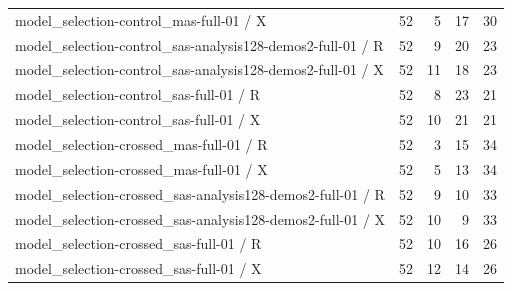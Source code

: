 \begin{longtable}{p{}rrrr}
model\_selection-control\_mas-full-01 / X & 52 & 5 & 17 & 30 \\
model\_selection-control\_sas-analysis128-demos2-full-01 / R & 52 & 9 & 20 & 23 \\
model\_selection-control\_sas-analysis128-demos2-full-01 / X & 52 & 11 & 18 & 23 \\
model\_selection-control\_sas-full-01 / R & 52 & 8 & 23 & 21 \\
model\_selection-control\_sas-full-01 / X & 52 & 10 & 21 & 21 \\
model\_selection-crossed\_mas-full-01 / R & 52 & 3 & 15 & 34 \\
model\_selection-crossed\_mas-full-01 / X & 52 & 5 & 13 & 34 \\
model\_selection-crossed\_sas-analysis128-demos2-full-01 / R & 52 & 9 & 10 & 33 \\
model\_selection-crossed\_sas-analysis128-demos2-full-01 / X & 52 & 10 & 9 & 33 \\
model\_selection-crossed\_sas-full-01 / R & 52 & 10 & 16 & 26 \\
model\_selection-crossed\_sas-full-01 / X & 52 & 12 & 14 & 26 \\
\end{longtable}